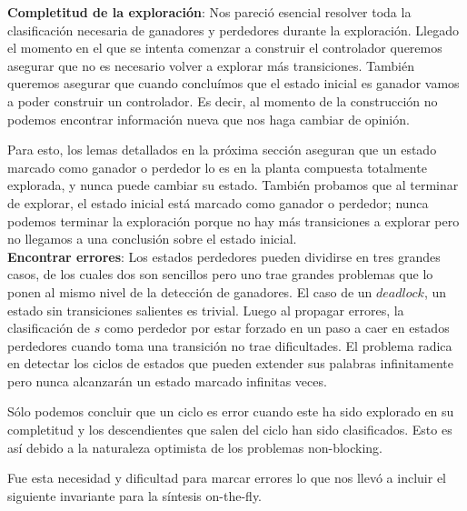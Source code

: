 \textbf{Completitud de la exploración}: Nos pareció esencial resolver toda la clasificación necesaria de ganadores y perdedores durante la exploración. Llegado el momento en el que se intenta comenzar a construir el controlador queremos asegurar que no es necesario volver a explorar más transiciones. También queremos asegurar que cuando concluímos que el estado inicial es ganador vamos a poder construir un controlador. Es decir, al momento de la construcción no podemos encontrar información nueva que nos haga cambiar de opinión.

Para esto, los lemas detallados en la próxima sección aseguran que un estado marcado como ganador o perdedor lo es en la planta compuesta totalmente explorada, y nunca puede cambiar su estado. También probamos que al terminar de explorar, el estado inicial está marcado como ganador o perdedor; nunca podemos terminar la exploración porque no hay más transiciones a explorar pero no llegamos a una conclusión sobre el estado inicial.\\

\textbf{Encontrar errores}: Los estados perdedores pueden dividirse en tres grandes casos, de los cuales dos son sencillos pero uno trae grandes problemas que lo ponen al mismo nivel de la detección de ganadores. El caso de un $deadlock$, un estado sin transiciones salientes es trivial. Luego al propagar errores, la clasificación de $s$ como perdedor por estar forzado en un paso a caer en estados perdedores cuando toma una transición no trae dificultades. El problema radica en detectar los ciclos de estados que pueden extender sus palabras infinitamente pero nunca alcanzarán un estado marcado infinitas veces. 

Sólo podemos concluir que un ciclo es error cuando este ha sido explorado en su completitud y los descendientes que salen del ciclo han sido clasificados. Esto es así debido a la naturaleza optimista de los problemas non-blocking. 


Fue esta necesidad y dificultad para marcar errores lo que nos llevó a incluir el siguiente invariante para la síntesis on-the-fly.\\

